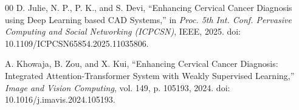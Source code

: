 \documentclass[preprint,12pt]{elsarticle}
\begin{document}
\begin{thebibliography}{00}
D. Julie, N. P., P. K., and S. Devi,
``Enhancing Cervical Cancer Diagnosis using Deep Learning based CAD Systems,''
in \textit{Proc. 5th Int. Conf. Pervasive Computing and Social Networking (ICPCSN)}, IEEE, 2025.
doi: 10.1109/ICPCSN65854.2025.11035806.


A. Khowaja, B. Zou, and X. Kui,
``Enhancing Cervical Cancer Diagnosis: Integrated Attention-Transformer System with Weakly Supervised Learning,''
\textit{Image and Vision Computing}, vol. 149, p. 105193, 2024.
doi: 10.1016/j.imavis.2024.105193.
\end{thebibliography}
\end{document}
